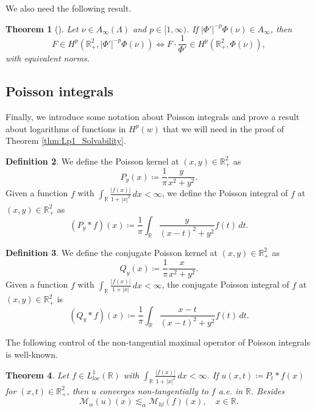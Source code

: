 \documentclass[12pt]{amsart}
\newcommand{\R}{\mathbb{R}}
\theoremstyle{plain}
\newtheorem{theorem}{Theorem}[section]
\theoremstyle{definition}
\newtheorem{definition}[theorem]{Definition}
\numberwithin{equation}{section}
\begin{document}
We also need the following result.

\begin{theorem}[\cite{AE_FBY}]
\label{thm:analogoLema4.1CNO}
    Let $\nu\in A_{\infty}(\Lambda)$ and $p\in [1,\infty)$. If $|\Phi'|^{-p}\Phi(\nu)\in A_\infty$, then
    \[
    F\in H^p(\R_{+}^{2},|\Phi'|^{-p}\Phi(\nu))
    \iff 
    F\cdot \frac{1}{\Phi'}\in H^p(\R_{+}^{2},\Phi(\nu)),
    \]
    with equivalent norms.
\end{theorem}






\subsection{Poisson integrals}

Finally, we introduce some notation about Poisson integrals and prove a result about logarithms of functions in $H^p(w)$ that we will need in the proof of Theorem \ref{thm:Lp1_Solvability}.



\begin{definition}
    We define the Poisson kernel at $(x,y)\in\R_{+}^{2}$ as
    \[
    P_{y}(x)
    \coloneqq 
    \frac{1}{\pi}\frac{y}{x^2+y^2}.
    \]
    Given a function $f$ with $\int_{\R}\frac{|f(x)|}{1+|x|^2}\, dx<\infty$, we define the Poisson integral of $f$ at $(x,y)\in\R_{+}^{2}$ as
    \begin{equation}\label{eq:definitionPoissonIntegral}
    (P_y\ast f)(x)
    \coloneqq 
    \frac{1}{\pi}\int_{\R}\frac{y}{(x-t)^2+y^2}f(t)\, dt.
    \end{equation}
\end{definition}


\begin{definition}
    We define the conjugate Poisson kernel at $(x,y)\in\R_{+}^{2}$ as
    \[
    Q_{y}(x)
    \coloneqq 
    \frac{1}{\pi}\frac{x}{x^2+y^2}.
    \]
    Given a function $f$ with $\int_{\R}\frac{|f(x)|}{1+|x|}\, dx<\infty$, the conjugate Poisson integral of $f$ at $(x,y)\in\R_{+}^{2}$ is
    \[
    (Q_y\ast f)(x)
    \coloneqq 
    \frac{1}{\pi}\int_{\R}\frac{x-t}{(x-t)^2+y^2}f(t)\, dt.
    \]
\end{definition}

The following control of the non-tangential maximal operator of Poisson integrals is well-known.

\begin{theorem}\label{thm:Stein_thm1Page197}
    Let $f\in L_{loc}^{1}(\R)$ with $\int_{\R}\frac{|f(x)|}{1+|x|^2}\, dx<\infty$. If $u(x,t)\coloneqq P_t\ast f(x)$ for $(x,t)\in\R_{+}^{2}$, then $u$ converges non-tangentially to $f$ a.e. in $\R$. Besides
    \[
    \mathcal{M}_{\alpha}(u)(x)
    \lesssim_{\alpha}
    \mathcal{M}_{hl}(f)(x),\quad x\in\R.
    \]
\end{theorem}
\end{document}
